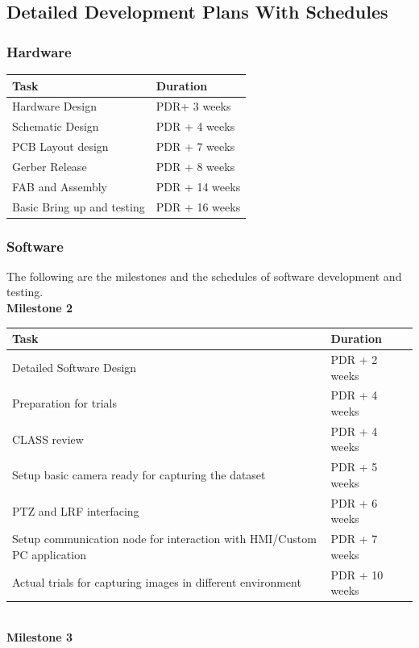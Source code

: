 \documentclass[a4paper,12pt]{article}
\begin{document}
\newpage
	\subsection{Detailed Development Plans With Schedules}
	\subsubsection{Hardware}
\begin{tabular}{|l|l|}
	\hline
	\textbf{Task} & \textbf{Duration} \\
	\hline
	Hardware Design & PDR+ 3 weeks \\
	\hline
	Schematic Design & PDR + 4 weeks \\
	\hline
	PCB Layout design & PDR + 7 weeks \\
	\hline
	Gerber Release & PDR + 8 weeks \\
	\hline
	FAB and Assembly & PDR + 14 weeks \\
	\hline
	Basic Bring up and testing & PDR + 16 weeks \\
	\hline
\end{tabular}

	\subsubsection{Software}
	The following are the milestones and the schedules of software development and testing.\\
	\textbf{Milestone 2}\\

\noindent
\begin{tabular}{|l|l|}
	\hline
	\textbf{Task} & \textbf{Duration} \\
	\hline
	Detailed Software Design & PDR + 2 weeks \\
	\hline
	Preparation for trials & PDR + 4 weeks \\
	\hline
	CLASS review & PDR + 4 weeks \\
	\hline
	Setup basic camera ready for capturing the dataset & PDR + 5 weeks \\
	\hline
	PTZ and LRF interfacing & PDR + 6 weeks \\
	\hline
	Setup communication node for interaction with HMI/Custom PC application & PDR + 7 weeks \\
	\hline
	Actual trials for capturing images in different environment & PDR + 10 weeks \\
	\hline
\end{tabular}\\
\newline
\noindent
	\textbf{Milestone 3}\\
	
\end{document}
